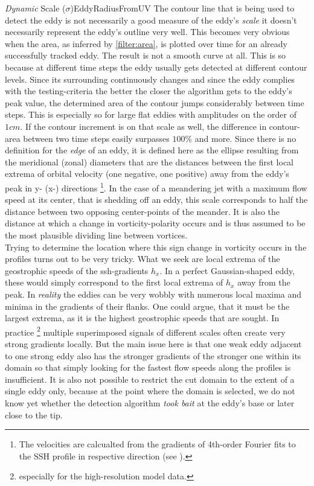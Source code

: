 \begin{filter}{\textit{Dynamic} Scale ($\sigma$)}{EddyRadiusFromUV}
 \label{filter:dynscale}
The contour line that is being used to detect the eddy is not
necessarily a good measure of the eddy's \textit{scale} \ie it doesn't
necessarily represent the eddy's outline very well. This becomes very
obvious when the area, as inferred by \ref{filter:area}, is plotted over time
for an already successfully tracked eddy. The result is not a smooth curve at
all. This is so because at different time steps the eddy usually gets detected
at different contour levels. Since its surrounding continuously changes and
since the eddy complies with the testing-criteria the better the closer the
algorithm gets to the eddy's peak value, the determined area of the contour
jumps considerably between time steps. This is especially so for large flat
eddies with amplitudes on the order of $1cm$. If the contour increment is on
that scale as well, the difference in contour-area between two time steps
easily surpasses $100\%$ and more.
Since there is no definition for the \textit{edge} of an eddy, it is defined here as the ellipse resulting from the meridional (zonal) diameters that
are the distances between the first local extrema of orbital velocity (one negative, one positive) away from
the eddy's peak in y- (x-) directions \footnote{The velocities are calcualted from the gradients of 4th-order Fourier fits to the SSH profile in respective direction (see ).}.
In the case of a meandering jet with a maximum flow speed at its center, that
is shedding off an eddy, this scale corresponds to half the distance between
two opposing center-points of the meander. It is also the distance at which a
change in vorticity-polarity occurs and is thus assumed to be the most plausible
dividing line between vortices. \\
Trying to determine the location where this sign change in vorticity occurs in the profiles turns out to be very tricky. What we seek are local extrema of the geostrophic speeds \ie of the ssh-gradients $h_x$. In a perfect Gaussian-shaped eddy, these would simply correspond to the first local extrema of $h_x$ away from the peak. In \textit{reality} the eddies can be very wobbly with numerous local maxima and minima in the gradients of their flanks. One could argue, that it must be the largest extrema, as it is the highest geostrophic speeds that are sought. In practice \footnote{especially for the high-resolution model data.} multiple superimposed signals of different scales often create very strong gradients locally. But the main issue here is that one weak eddy adjacent to one strong eddy also has the stronger gradients of the stronger one within its domain so that simply looking for the fastest flow speeds along the profiles is insufficient. It is also not possible to restrict the cut domain to the extent of a single eddy only, because at the point where the domain is selected, we do not know yet whether the detection algorithm \textit{took bait} at the eddy's base or later close to the tip. \\

\end{filter}
